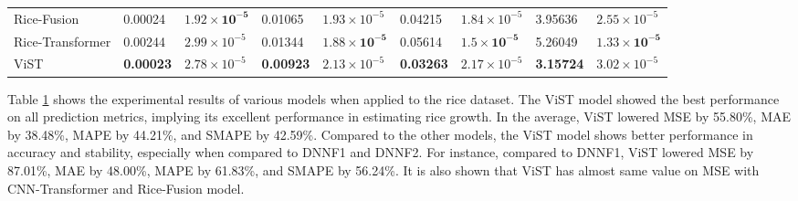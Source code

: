 \documentclass[acmsmall,manuscript, screen, review]{acmart}
\begin{document}
\begin{table}[htbp]
\begin{tabular}{lllllllll}
    Rice-Fusion & 0.00024 & \begin{math}\mathbf{1.92\times 10^{-5}}\end{math} & 0.01065 & \begin{math}1.93\times 10^{-5}\end{math} & 0.04215 & \begin{math}1.84\times 10^{-5}\end{math} & 3.95636 & \begin{math}2.55\times 10^{-5}\end{math} \\
    Rice-Transformer & 0.00244 & \begin{math}2.99\times 10^{-5}\end{math} & 0.01344 & \begin{math}\mathbf{1.88\times 10^{-5}}\end{math} & 0.05614 & \begin{math}\mathbf{1.5\times 10^{-5}}\end{math} & 5.26049 & \begin{math}\mathbf{1.33\times 10^{-5}}\end{math} \\
    ViST  & \textbf{0.00023} & \begin{math}2.78\times 10^{-5}\end{math} & \textbf{0.00923} & \begin{math}2.13\times 10^{-5}\end{math} & \textbf{0.03263} & \begin{math}2.17\times 10^{-5}\end{math} & \textbf{3.15724} & \begin{math}3.02\times 10^{-5}\end{math} \\
    \bottomrule
    \end{tabular}%
  \label{rice_results}%
\end{table}%



Table \ref{rice_results} shows the experimental results of various models when applied to the rice dataset. The ViST model showed the best performance on all prediction metrics, implying its excellent performance in estimating rice growth. In the average, ViST lowered MSE by 55.80\%, MAE by 38.48\%, MAPE by 44.21\%, and SMAPE by 42.59\%. Compared to the other models, the ViST model shows better performance in accuracy and stability, especially when compared to DNNF1 and DNNF2. For instance, compared to DNNF1, ViST lowered MSE by 87.01\%, MAE by 48.00\%, MAPE by 61.83\%, and SMAPE by 56.24\%. It is also shown that ViST has almost same value on MSE with CNN-Transformer and Rice-Fusion model.
\end{document}
